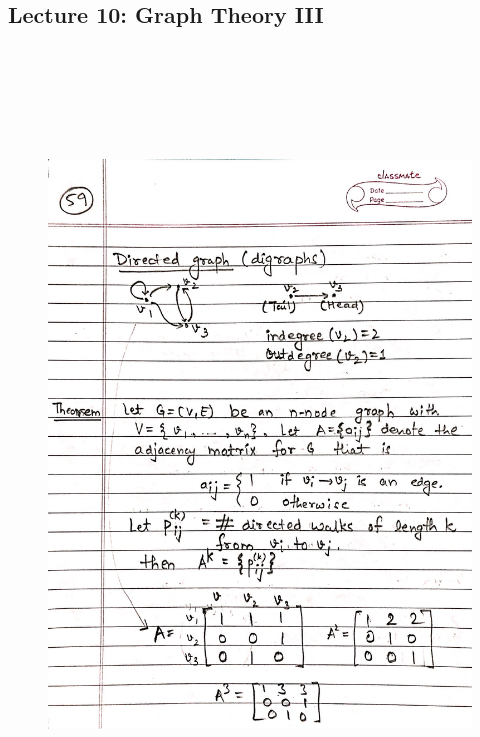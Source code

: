 \newpage
{\color{black} \subsection*{Lecture 10: Graph Theory III}}
\begin{figure}[H]
    \centering
    \includegraphics[width=16cm, height=21cm]{"./MIT-6.042J/MIT-6042J-059"}
\end{figure}

